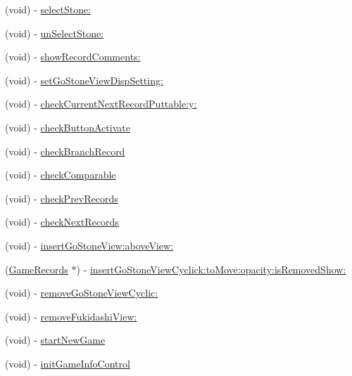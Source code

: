 \begin{DoxyCompactItemize}
(void) -\/ \hyperlink{interface_abstract_record_view_controller_a7333f8f2e63c9317f7506eac03cbdfcc}{selectStone:}
\item 
(void) -\/ \hyperlink{interface_abstract_record_view_controller_a564c9cd96efeef4230c25e281956100a}{unSelectStone:}
\item 
(void) -\/ \hyperlink{interface_abstract_record_view_controller_a23b80c32b7129ca1179a421f4b45a24e}{showRecordComments:}
\item 
(void) -\/ \hyperlink{interface_abstract_record_view_controller_a2d7a681d978dd332edcbe7ee9a01e0a0}{setGoStoneViewDispSetting:}
\item 
(void) -\/ \hyperlink{interface_abstract_record_view_controller_a8c9a3720bbcb3ac55d0697c1372b0f8b}{checkCurrentNextRecordPuttable:y:}
\item 
(void) -\/ \hyperlink{interface_abstract_record_view_controller_a778850dccbf812d31aa9c0af085524b8}{checkButtonActivate}
\item 
(void) -\/ \hyperlink{interface_abstract_record_view_controller_aa9e3322b6d0237359c2bb22952aab672}{checkBranchRecord}
\item 
(void) -\/ \hyperlink{interface_abstract_record_view_controller_a0bfed8687161c14e782505a08de09ef5}{checkComparable}
\item 
(void) -\/ \hyperlink{interface_abstract_record_view_controller_a97400ed3e78f1e33b83e32d0faaaae54}{checkPrevRecords}
\item 
(void) -\/ \hyperlink{interface_abstract_record_view_controller_a6b981a14f16bb0b25431714ec0678b73}{checkNextRecords}
\item 
(void) -\/ \hyperlink{interface_abstract_record_view_controller_aeea6171adc78fdd4f32598d732c3d503}{insertGoStoneView:aboveView:}
\item 
(\hyperlink{interface_game_records}{GameRecords} $\ast$) -\/ \hyperlink{interface_abstract_record_view_controller_a6b332a9fa53a850166a12a5f5d6a99fe}{insertGoStoneViewCyclick:toMove:opacity:isRemovedShow:}
\item 
(void) -\/ \hyperlink{interface_abstract_record_view_controller_a7e16eb8996e2d0b5d825374d564a533c}{removeGoStoneViewCyclic:}
\item 
(void) -\/ \hyperlink{interface_abstract_record_view_controller_a5c2b862f989de9a75963fc9bb5dca7f7}{removeFukidashiView:}
\item 
(void) -\/ \hyperlink{interface_abstract_record_view_controller_a67b4f0f87e9ed347378125b6a834cfdd}{startNewGame}
\item 
(void) -\/ \hyperlink{interface_abstract_record_view_controller_a3edda20fcfcbeb5c4f3a453aedbfc1e2}{initGameInfoControl}

\end{DoxyCompactItemize}
